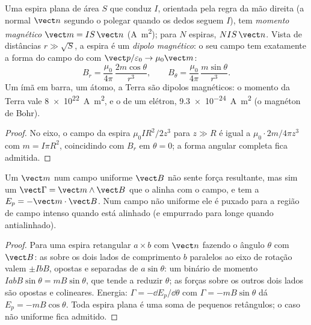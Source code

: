 \begin{definition}\label{def:b1:magnetostatics:moment}
Uma espira plana de área $S$ que conduz $I$, orientada pela regra da mão direita
(a normal $\vect n$ segundo o polegar quando os dedos seguem $I$), tem
\emph{momento magnético} $\vect m = IS\,\vect n$ (\unit{A.m^2}); para $N$
espiras, $NIS\,\vect n$. Vista de distâncias $r \gg \sqrt S$, a espira é um
\emph{dipolo magnético}: o seu campo tem exatamente a forma do campo do  com $\vect p/\varepsilon_0 \to \mu_0\vect m$:
\[
B_r = \frac{\mu_0}{4\pi}\,\frac{2m\cos\theta}{r^3}, \qquad
B_\theta = \frac{\mu_0}{4\pi}\,\frac{m\sin\theta}{r^3} .
\]
Um ímã em barra, um átomo, a Terra são dipolos magnéticos: o momento da
Terra vale \qty{8e22}{A.m^2}, e o de um elétron, \qty{9.3e-24}{A.m^2} (o
magnéton de Bohr).
\end{definition}

\begin{proof}
No eixo, o campo da espira $\mu_0IR^2/2z^3$ para $z \gg R$ é igual a
$\mu_0 \cdot 2m/4\pi z^3$ com $m = I\pi R^2$, coincidindo com $B_r$ em $\theta = 0$;
a forma angular completa fica admitida.
\end{proof}

\begin{theorem}\label{thm:b1:magnetostatics:dipoleinfield}
Um  $\vect m$ num campo uniforme $\vect B$ não sente força
resultante, mas sim um  $\vect\Gamma = \vect m\wedge\vect B$ que o alinha com
o campo, e tem a  $E_p = -\vect m\cdot\vect B$. Num
campo não uniforme ele é puxado para a região de campo intenso quando está
alinhado (e empurrado para longe quando antialinhado).
\end{theorem}

\begin{proof}
Para uma espira retangular $a \times b$ com $\vect n$ fazendo o ângulo $\theta$ com
$\vect B$: as  sobre os dois lados de comprimento $b$ paralelos ao
eixo de rotação valem $\pm IbB$, opostas e separadas de $a\sin\theta$:
um binário de momento $IabB\sin\theta = mB\sin\theta$, que tende a
reduzir $\theta$; as forças sobre os outros dois lados são opostas e
colineares. Energia: $\Gamma = -\dd E_p/\dd\theta$ com $\Gamma = -mB\sin\theta$
dá $E_p = -mB\cos\theta$. Toda espira plana é uma soma de pequenos retângulos;
o caso não uniforme fica admitido.
\end{proof}

